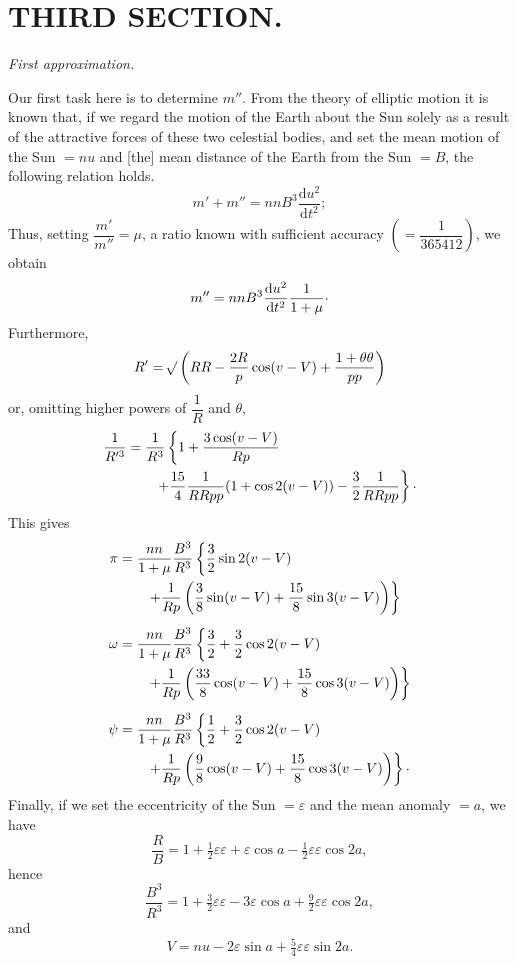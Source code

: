 \clearpage
\begingroup
{}
\renewcommand{\headrulewidth}{0pt}
\section*{THIRD SECTION.}
\begin{center}
\itshape First approximation.
\end{center}

\par\noindent\hspace*{\parindent}Our first task here is to determine \(m''\).
From the theory of elliptic motion it is known that, if we regard the
motion of the Earth about the Sun solely as a result of the attractive forces of these
two celestial bodies, and set the mean motion of the Sun \(=nu\) and
[the] mean distance of the Earth from the Sun \(=B\), the following relation holds.
\[
m'+m''=nnB^3\frac{\mathrm{d}u^2}{\mathrm{d}t^2};
\]
\noindent Thus, setting \(\dfrac{m'}{m''}=\mu\), a ratio known with sufficient
accuracy \(\left(=\dfrac{1}{365412}\right)\), we obtain
\[
m''=nnB^3\frac{\mathrm{d}u^2}{\mathrm{d}t^2}\frac{1}{1+\mu}
\mathpunct{\raisebox{.4ex}{.}}
\]
\noindent Furthermore,
\[
R'=\mathord{{}^{}\!\surd}\left(RR-\frac{2R}{p}\cos(v-V)+\frac{1+\theta\theta}{pp}\right)
\]
\noindent or, omitting higher powers of \(\dfrac{1}{R}\) and \(\theta\),
\[
\begin{aligned}
\frac{1}{R'^3}&=\frac{1}{R^3}\left\{1+\frac{3\cos(v-V)}{Rp}\right.\\
&\qquad\left.+\frac{15}{4}\frac{1}{RRpp}(1+\cos2(v-V))
-\frac32\frac{1}{RRpp}\right\}\mathpunct{\raisebox{.4ex}{.}}
\end{aligned}
\]
\noindent This gives
\[
\begin{aligned}
\pi&=\frac{nn}{1+\mu}\frac{B^3}{R^3}\left\{\frac32\sin2(v-V)\right.\\
&\qquad\left.+\frac{1}{Rp}\left(\frac38\sin(v-V)+\frac{15}{8}\sin3(v-V)\right)\right\}\\[5pt]
\omega&=\frac{nn}{1+\mu}\frac{B^3}{R^3}\left\{\frac32+\frac32\cos2(v-V)\right.\\
&\qquad\left.+\frac{1}{Rp}\left(\frac{33}{8}\cos(v-V)+\frac{15}{8}\cos3(v-V)\right)\right\}\\[5pt]
\psi&=\frac{nn}{1+\mu}\frac{B^3}{R^3}\left\{\frac12+\frac32\cos2(v-V)\right.\\
&\qquad\left.+\frac{1}{Rp}\left(\frac98\cos(v-V)+\frac{15}{8}\cos3(v-V)\right)\right\}
\mathpunct{\raisebox{.4ex}{.}}
\end{aligned}
\]
\noindent Finally, if we set the eccentricity of the Sun \(=\varepsilon\) and the mean
anomaly \(=a\), we have
\[
\frac{R}{B}=1+\tfrac12\varepsilon\varepsilon+\varepsilon\cos a
-\tfrac12\varepsilon\varepsilon\cos2a,
\]
\noindent hence
\[
\frac{B^3}{R^3}=1+\tfrac32\varepsilon\varepsilon-3\varepsilon\cos a
+\tfrac92\varepsilon\varepsilon\cos2a,
\]
\noindent and
\[
V=nu-2\varepsilon\sin a+\tfrac54\varepsilon\varepsilon\sin2a.
\]

